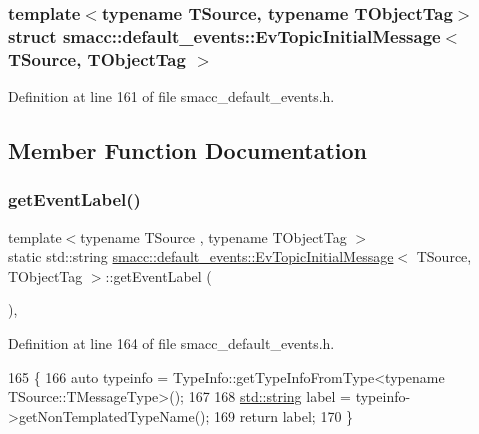 \subsubsection*{template$<$typename T\+Source, typename T\+Object\+Tag$>$\newline
struct smacc\+::default\+\_\+events\+::\+Ev\+Topic\+Initial\+Message$<$ T\+Source, T\+Object\+Tag $>$}



Definition at line 161 of file smacc\+\_\+default\+\_\+events.\+h.



\subsection{Member Function Documentation}
\mbox{\label{structsmacc_1_1default__events_1_1EvTopicInitialMessage_a7532e8ca89792c94c46074076e59d265}} 
\subsubsection{\texorpdfstring{get\+Event\+Label()}{getEventLabel()}}
{\footnotesize\ttfamily template$<$typename T\+Source , typename T\+Object\+Tag $>$ \\
static std\+::string \hyperlink{structsmacc_1_1default__events_1_1EvTopicInitialMessage}{smacc\+::default\+\_\+events\+::\+Ev\+Topic\+Initial\+Message}$<$ T\+Source, T\+Object\+Tag $>$\+::get\+Event\+Label (\begin{DoxyParamCaption}{ }\end{DoxyParamCaption})\hspace{0.3cm}{\ttfamily [inline]}, {\ttfamily [static]}}



Definition at line 164 of file smacc\+\_\+default\+\_\+events.\+h.


\begin{DoxyCode}
165   \{
166     \textcolor{keyword}{auto} typeinfo = TypeInfo::getTypeInfoFromType<typename TSource::TMessageType>();
167 
168     \hyperlink{namespacetesting_1_1internal_a8e8ff5b11e64078831112677156cb111}{std::string} label = typeinfo->getNonTemplatedTypeName();
169     \textcolor{keywordflow}{return} label;
170   \}
\end{DoxyCode}



